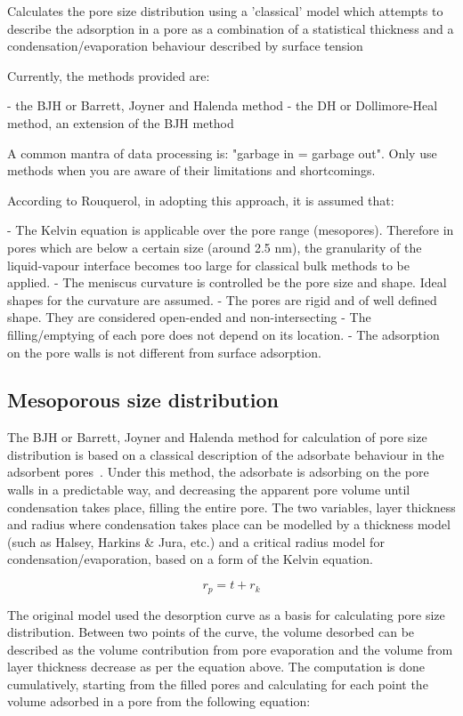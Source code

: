 
Calculates the pore size distribution using a 'classical' model which attempts to
describe the adsorption in a pore as a combination of a statistical thickness and
a condensation/evaporation behaviour described by surface tension

Currently, the methods provided are:

    - the BJH or Barrett, Joyner and Halenda method
    - the DH or Dollimore-Heal method, an extension of the BJH method

A common mantra of data processing is: "garbage in = garbage out". Only use methods
when you are aware of their limitations and shortcomings.

According to Rouquerol, in adopting this approach, it is assumed that:

    - The Kelvin equation is applicable over the pore range (mesopores). Therefore
    in pores which are below a certain size (around 2.5 nm), the granularity
    of the liquid-vapour interface becomes too large for classical bulk methods
    to be applied.
    - The meniscus curvature is controlled be the pore size and shape. Ideal shapes
    for the curvature are assumed.
    - The pores are rigid and of well defined shape. They are considered
    open-ended and non-intersecting
    - The filling/emptying of each pore does not depend on its location.
    - The adsorption on the pore walls is not different from surface adsorption.

\subsection{Mesoporous size distribution}


The BJH or Barrett, Joyner and Halenda method for calculation of pore size distribution
is based on a classical description of the adsorbate behaviour in the adsorbent
pores~\cite{barrettDeterminationPoreVolume1951}.
Under this method, the adsorbate is adsorbing on the pore walls in a predictable way,
and decreasing the apparent pore volume until condensation takes place, filling the
entire pore. The two variables, layer thickness and radius where 
condensation takes place can be modelled by a thickness model
(such as Halsey, Harkins \& Jura, etc.) and a
critical radius model for condensation/evaporation, based on a form of the Kelvin equation.

\begin{equation}
    r_p = t + r_k
\end{equation}

The original model used the desorption curve as a basis for calculating pore size distribution.
Between two points of the curve, the volume desorbed can be described as the volume contribution
from pore evaporation and the volume from layer thickness decrease as per the equation
above. The computation is done cumulatively, starting from the filled pores and 
calculating for each point the volume adsorbed in a pore from the following equation:

